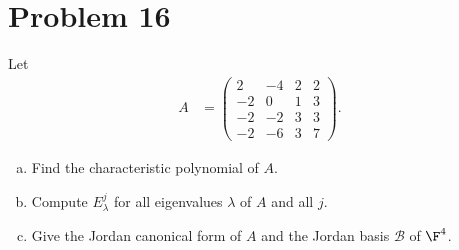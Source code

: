 \documentclass[10pt]{mypackage}
\begin{document}
\section{Problem 16}%
\begin{problem}
  Let
  \begin{align*}
    A &= \begin{pmatrix}2 & -4 & 2 & 2 \\ -2 & 0 & 1 & 3 \\ -2 & -2 & 3 & 3 \\ -2 & -6 & 3 & 7\end{pmatrix}.
  \end{align*}
  \begin{enumerate}[(a)]
    \item Find the characteristic polynomial of $A$.
    \item Compute $E_{\lambda}^{j}$ for all eigenvalues $\lambda$ of $A$ and all $j$.
    \item Give the Jordan canonical form of $A$ and the Jordan basis $\mathcal{B}$ of $\F^4$.
  \end{enumerate}
\end{problem}
\end{document}
